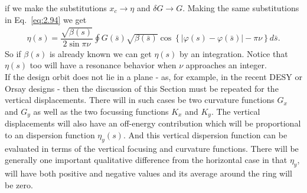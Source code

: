  if we make the substitutions $x_c \to \eta$ and $\delta G \to G$. Making the same substitutions
 in Eq.~\eqref{eq:2.94} we get
\begin{align}
	\boxed{ \eta(s) = \dfrac{\sqrt{\beta(s)}}{2\sin\pi\nu}\oint G(\bar{s})\sqrt{\beta(\bar{s})}\cos\left\lbrace |\varphi(s) - \varphi(\bar{s})| - \pi\nu \right\rbrace d\bar{s}}.
\end{align}
So if $\beta(s)$ is already known we can get $\eta(s)$ by an integration. Notice that $\eta(s)$ too will have a resonance behavior when $\nu$ approaches an integer.\\
If the design orbit does not lie in a plane - as, for example, in the recent DESY or Orsay designs - then the discussion of this Section must be repeated for the vertical displacements.
 There will in such cases be two curvature functions $G_x$ and $G_y$ as well as the two focussing functions $K_x$ and $K_y$. The vertical displacements will also have an off-energy contribution which will be proportional to an dispersion function $\eta_y(s)$. And this vertical
 dispersion function can be evaluated in terms of the vertical focusing and curvature functions.
 There will be generally one important qualitative difference from the horizontal case in that $\eta_y$, will have both positive and negative values and its average around the ring will be zero.
